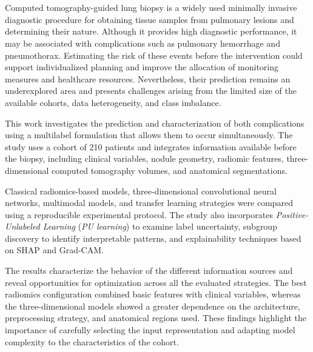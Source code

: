 \\

\vspace{0.7cm}
\\

Computed tomography-guided lung biopsy is a widely used minimally invasive diagnostic procedure for obtaining tissue samples from pulmonary lesions and determining their nature. Although it provides high diagnostic performance, it may be associated with complications such as pulmonary hemorrhage and pneumothorax. Estimating the risk of these events before the intervention could support individualized planning and improve the allocation of monitoring measures and healthcare resources. Nevertheless, their prediction remains an underexplored area and presents challenges arising from the limited size of the available cohorts, data heterogeneity, and class imbalance.

This work investigates the prediction and characterization of both complications using a multilabel formulation that allows them to occur simultaneously. The study uses a cohort of 210 patients and integrates information available before the biopsy, including clinical variables, nodule geometry, radiomic features, three-dimensional computed tomography volumes, and anatomical segmentations.

Classical radiomics-based models, three-dimensional convolutional neural networks, multimodal models, and transfer learning strategies were compared using a reproducible experimental protocol. The study also incorporates \textit{Positive-Unlabeled Learning} (\textit{PU learning}) to examine label uncertainty, subgroup discovery to identify interpretable patterns, and explainability techniques based on SHAP and Grad-CAM.

The results characterize the behavior of the different information sources and reveal opportunities for optimization across all the evaluated strategies. The best radiomics configuration combined basic features with clinical variables, whereas the three-dimensional models showed a greater dependence on the architecture, preprocessing strategy, and anatomical regions used. These findings highlight the importance of carefully selecting the input representation and adapting model complexity to the characteristics of the cohort.

